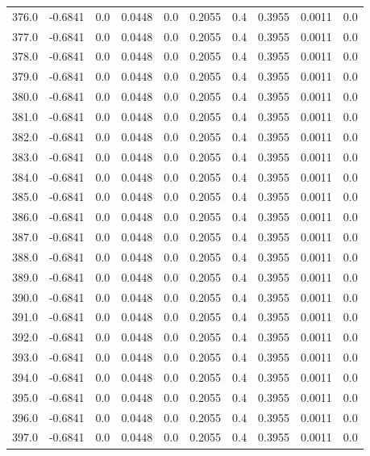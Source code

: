 \begin{longtable}{lrrrrrrrrr}
376.0 & -0.6841 & 0.0 & 0.0448 & 0.0 & 0.2055 & 0.4 & 0.3955 & 0.0011 & 0.0 \\
377.0 & -0.6841 & 0.0 & 0.0448 & 0.0 & 0.2055 & 0.4 & 0.3955 & 0.0011 & 0.0 \\
378.0 & -0.6841 & 0.0 & 0.0448 & 0.0 & 0.2055 & 0.4 & 0.3955 & 0.0011 & 0.0 \\
379.0 & -0.6841 & 0.0 & 0.0448 & 0.0 & 0.2055 & 0.4 & 0.3955 & 0.0011 & 0.0 \\
380.0 & -0.6841 & 0.0 & 0.0448 & 0.0 & 0.2055 & 0.4 & 0.3955 & 0.0011 & 0.0 \\
381.0 & -0.6841 & 0.0 & 0.0448 & 0.0 & 0.2055 & 0.4 & 0.3955 & 0.0011 & 0.0 \\
382.0 & -0.6841 & 0.0 & 0.0448 & 0.0 & 0.2055 & 0.4 & 0.3955 & 0.0011 & 0.0 \\
383.0 & -0.6841 & 0.0 & 0.0448 & 0.0 & 0.2055 & 0.4 & 0.3955 & 0.0011 & 0.0 \\
384.0 & -0.6841 & 0.0 & 0.0448 & 0.0 & 0.2055 & 0.4 & 0.3955 & 0.0011 & 0.0 \\
385.0 & -0.6841 & 0.0 & 0.0448 & 0.0 & 0.2055 & 0.4 & 0.3955 & 0.0011 & 0.0 \\
386.0 & -0.6841 & 0.0 & 0.0448 & 0.0 & 0.2055 & 0.4 & 0.3955 & 0.0011 & 0.0 \\
387.0 & -0.6841 & 0.0 & 0.0448 & 0.0 & 0.2055 & 0.4 & 0.3955 & 0.0011 & 0.0 \\
388.0 & -0.6841 & 0.0 & 0.0448 & 0.0 & 0.2055 & 0.4 & 0.3955 & 0.0011 & 0.0 \\
389.0 & -0.6841 & 0.0 & 0.0448 & 0.0 & 0.2055 & 0.4 & 0.3955 & 0.0011 & 0.0 \\
390.0 & -0.6841 & 0.0 & 0.0448 & 0.0 & 0.2055 & 0.4 & 0.3955 & 0.0011 & 0.0 \\
391.0 & -0.6841 & 0.0 & 0.0448 & 0.0 & 0.2055 & 0.4 & 0.3955 & 0.0011 & 0.0 \\
392.0 & -0.6841 & 0.0 & 0.0448 & 0.0 & 0.2055 & 0.4 & 0.3955 & 0.0011 & 0.0 \\
393.0 & -0.6841 & 0.0 & 0.0448 & 0.0 & 0.2055 & 0.4 & 0.3955 & 0.0011 & 0.0 \\
394.0 & -0.6841 & 0.0 & 0.0448 & 0.0 & 0.2055 & 0.4 & 0.3955 & 0.0011 & 0.0 \\
395.0 & -0.6841 & 0.0 & 0.0448 & 0.0 & 0.2055 & 0.4 & 0.3955 & 0.0011 & 0.0 \\
396.0 & -0.6841 & 0.0 & 0.0448 & 0.0 & 0.2055 & 0.4 & 0.3955 & 0.0011 & 0.0 \\
397.0 & -0.6841 & 0.0 & 0.0448 & 0.0 & 0.2055 & 0.4 & 0.3955 & 0.0011 & 0.0 \\

\end{longtable}
